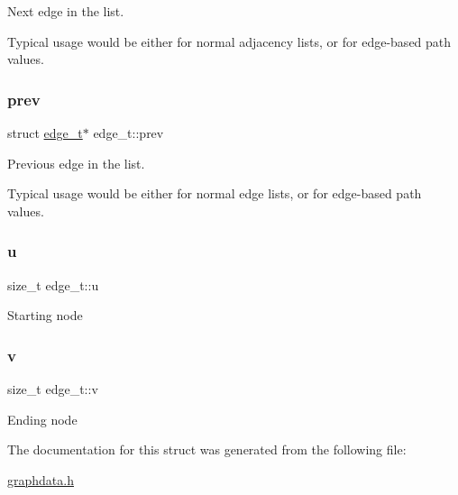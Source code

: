 Next edge in the list. 

Typical usage would be either for normal adjacency lists, or for edge-\/based path values. \mbox{\label{structedge__t_ad68c87997feb8fdf8f38703a275b3b29}} 
\subsubsection{\texorpdfstring{prev}{prev}}
{\footnotesize\ttfamily struct \hyperlink{structedge__t}{edge\+\_\+t}$\ast$ edge\+\_\+t\+::prev}



Previous edge in the list. 

Typical usage would be either for normal edge lists, or for edge-\/based path values. \mbox{\label{structedge__t_a2bd21781f62242a78e70595ea781769c}} 
\subsubsection{\texorpdfstring{u}{u}}
{\footnotesize\ttfamily size\+\_\+t edge\+\_\+t\+::u}

Starting node \mbox{\label{structedge__t_a23bf912e6f3c953e2f8577ab7c692e85}} 
\subsubsection{\texorpdfstring{v}{v}}
{\footnotesize\ttfamily size\+\_\+t edge\+\_\+t\+::v}

Ending node 

The documentation for this struct was generated from the following file\+:\begin{DoxyCompactItemize}
\item 
\hyperlink{graphdata_8h}{graphdata.\+h}\end{DoxyCompactItemize}
